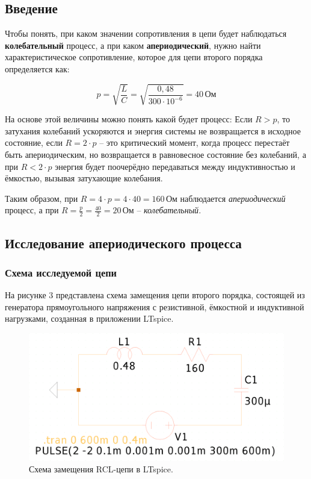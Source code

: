 \subsection{Введение}

Чтобы понять, при каком значении сопротивления в цепи будет наблюдаться \textbf{колебательный} процесс, а при каком \textbf{апериодический}, нужно найти характеристическое сопротивление, которое для цепи второго порядка определяется как:

\[
	p = \sqrt{\frac{L}{C}} = \sqrt{\frac{0,48}{300 \cdot 10^{-6}}} = 40 \, \text{Ом}
\]

На основе этой величины можно понять какой будет процесс: Если $R > p$, то затухания колебаний ускоряются и энергия системы не возвращается в исходное состояние, если $R = 2 \cdot p$ -- это критический момент, когда процесс перестаёт быть апериодическим, но возвращается в равновесное состояние без колебаний, а при $R < 2 \cdot p$ энергия будет поочерёдно передаваться между индуктивностью и ёмкостью, вызывая затухающие колебания.

Таким образом, при $R = 4 \cdot p = 4 \cdot 40 = 160 \, \text{Ом}$ наблюдается \textit{апериодический} процесс, а при $R = \frac{p}{2} = \frac{40}{2} = 20 \, \text{Ом}$ -- \textit{колебательный}.




\subsection{Исследование апериодического процесса}

\subsubsection{Схема исследуемой цепи}
На рисунке 3 представлена схема замещения цепи второго порядка, состоящей из генератора прямоугольного напряжения с резистивной, ёмкостной и индуктивной нагрузками, созданная в приложении LTspice.

\begin{figure}[H]
	\centering
	\includegraphics[width=1\textwidth]{./data/rcl_1-schema.png}
	\caption{Схема замещения RCL-цепи в LTspice.}
\end{figure}

